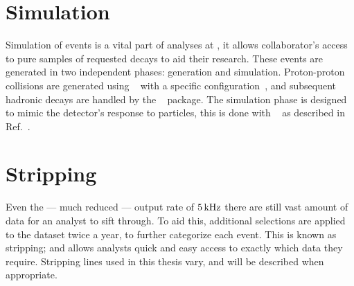 \section{Simulation}
Simulation of events is a vital part of analyses at \lhcb, it allows collaborator's access to pure
samples of requested decays to aid their research.
These events are generated in two independent phases: generation and simulation.
Proton-proton collisions are generated using \pythia~\cite{Sjostrand:2006za,*Sjostrand:2007gs}
with a specific \lhcb configuration~\cite{LHCb-PROC-2010-056},
and subsequent hadronic decays are handled by the \evtgen~\cite{Lange:2001uf} package.
The simulation phase is designed to mimic the \lhcb detector's response to particles, this is done
with \geant~\cite{Allison:2006ve, *Agostinelli:2002hh} as described in
Ref.~\cite{LHCb-PROC-2011-006}.


\section{Stripping}
Even the --- much reduced --- output rate of $5{\rm \,kHz}$ there are still vast amount of data for an
analyst to sift through.
To aid this, additional selections are applied to the dataset twice a year, to further categorize
each event.
This is known as stripping; and allows analysts quick and easy access to exactly which data they
require.
Stripping lines used in this thesis vary, and will be described when appropriate.

























